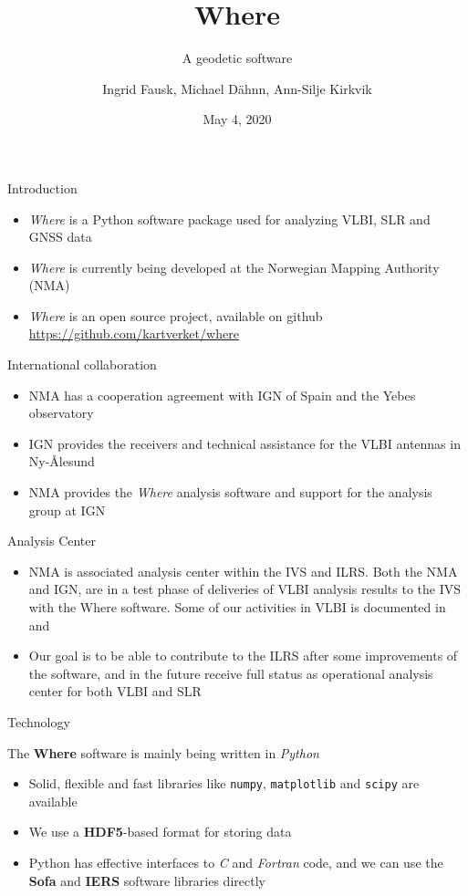 \documentclass[12pt]{beamer}
\title{Where}
\subtitle{A geodetic software}
\author{Ingrid Fausk, Michael D\"ahnn, Ann-Silje Kirkvik}
\date{May 4, 2020}
\begin{document}
\frame{\titlepage}

\begin{frame}{Introduction}
\begin{itemize}
\item
  \textit{Where} is a Python software package used for analyzing VLBI, SLR and GNSS data
\item
  \textit{Where} is currently being developed at the Norwegian Mapping Authority (NMA)
\item
  \textit{Where} is an open source project, available on github \url{https://github.com/kartverket/where}
\end{itemize}
\end{frame}


\begin{frame}{International collaboration}
\begin{itemize}
\item 
  NMA has a cooperation agreement with IGN of Spain and the Yebes observatory
\item 
  IGN provides the receivers and technical assistance for the VLBI antennas in Ny-{\AA}lesund
\item 
  NMA provides the \textit{Where} analysis software and support for the analysis group at IGN
\end{itemize}
\end{frame}


\begin{frame}{Analysis Center}
\begin{itemize}
\item
  NMA is associated analysis center within the IVS and ILRS. Both the NMA and IGN,
  are in a test phase of deliveries of VLBI analysis results to the IVS
  with the Where software. Some of our activities in VLBI is documented
  in~\cite{kirkvik2017b} and~\cite{kirkvik2018}
\item
  Our goal is to be able to contribute to the ILRS after some improvements of the
  software, and in the future receive full status as operational analysis center
  for both VLBI and SLR
\end{itemize}
\end{frame}


\begin{frame}{Technology}

The \textbf{Where} software is mainly being written in \emph{Python}

\begin{itemize}
\item
  Solid, flexible and fast libraries like \texttt{numpy},
  \texttt{matplotlib} and \texttt{scipy} are available
\item
  We use a \textbf{HDF5}-based format for storing data
\item
  Python has effective interfaces to \emph{C} and \emph{Fortran}
  code, and we can use the \textbf{Sofa} and \textbf{IERS} software
  libraries directly
\end{itemize}
\end{frame}
\end{document}
